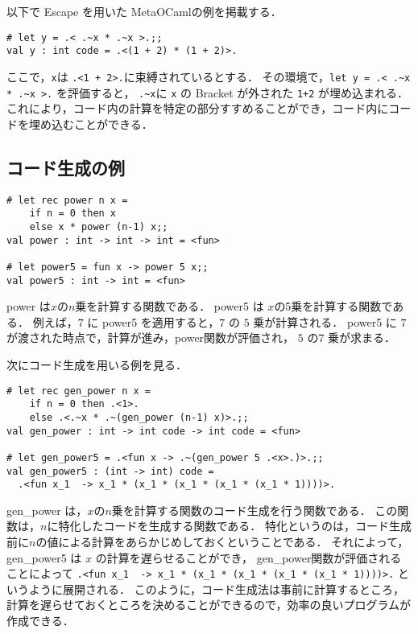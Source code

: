 以下で Escape を用いた MetaOCamlの例を掲載する．
\begin{lstlisting}
# let y = .< .~x * .~x >.;;
val y : int code = .<(1 + 2) * (1 + 2)>.
\end{lstlisting}
ここで，\lstinline|x|は \lstinline|.<1 + 2>.|に束縛されているとする．
その環境で，\lstinline|let y = .< .~x * .~x >.| を評価すると，
\lstinline|.~x|に \lstinline|x| の Bracket が外された \lstinline|1+2| が埋め込まれる．
これにより，コード内の計算を特定の部分すすめることができ，コード内にコードを埋め込むことができる．

\subsection{コード生成の例}

\begin{lstlisting}
# let rec power n x =
    if n = 0 then x
    else x * power (n-1) x;;
val power : int -> int -> int = <fun>

# let power5 = fun x -> power 5 x;;
val power5 : int -> int = <fun>
\end{lstlisting}

power は$x$の$n$乗を計算する関数である．
power5 は $x$の5乗を計算する関数である．
例えば，$7$ に power5 を適用すると，$7$ の $5$ 乗が計算される．
power5 に $7$ が渡された時点で，計算が進み，power関数が評価され， $5$ の$7$ 乗が求まる．

次にコード生成を用いる例を見る．

\begin{lstlisting}
# let rec gen_power n x =
    if n = 0 then .<1>.
    else .<.~x * .~(gen_power (n-1) x)>.;;
val gen_power : int -> int code -> int code = <fun>

# let gen_power5 = .<fun x -> .~(gen_power 5 .<x>.)>.;;
val gen_power5 : (int -> int) code =
  .<fun x_1  -> x_1 * (x_1 * (x_1 * (x_1 * (x_1 * 1))))>.
\end{lstlisting}

gen\_power は，$x$の$n$乗を計算する関数のコード生成を行う関数である．
この関数は，$n$に特化したコードを生成する関数である．
特化というのは，コード生成前に$n$の値による計算をあらかじめしておくということである．
それによって，gen\_power5 は $x$ の計算を遅らせることができ，
gen\_power関数が評価されることによって \lstinline|.<fun x_1  -> x_1 * (x_1 * (x_1 * (x_1 * (x_1 * 1))))>.| というように展開される．
このように，コード生成法は事前に計算するところ，計算を遅らせておくところを決めることができるので，効率の良いプログラムが作成できる．


